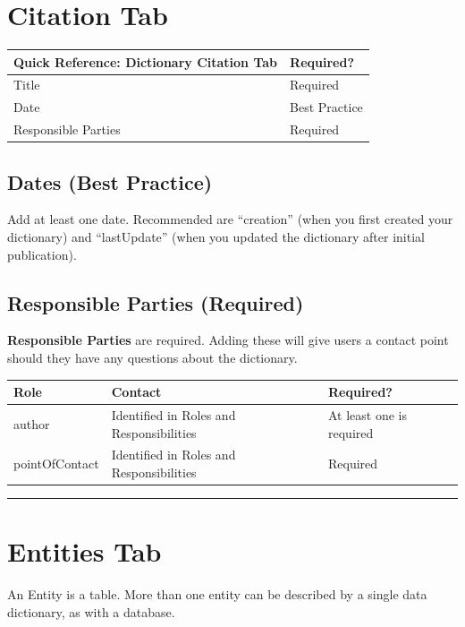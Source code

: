 \documentclass[
]{book}
\begin{document}
\hypertarget{citation-tab}{%
\section{Citation Tab}\label{citation-tab}}

\begin{longtable}[]{@{}ll@{}}
\toprule
Quick Reference: Dictionary Citation Tab & Required?\tabularnewline
\midrule
\endhead
Title & Required\tabularnewline
Date & Best Practice\tabularnewline
Responsible Parties & Required\tabularnewline
\bottomrule
\end{longtable}

\hypertarget{dates-best-practice}{%
\subsection{Dates (Best Practice)}\label{dates-best-practice}}

Add at least one date. Recommended are ``creation'' (when you first created your dictionary) and ``lastUpdate'' (when you updated the dictionary after initial publication).

\hypertarget{responsible-parties-required}{%
\subsection{Responsible Parties (Required)}\label{responsible-parties-required}}

\textbf{Responsible Parties} are required. Adding these will give users a contact point should they have any questions about the dictionary.

\begin{longtable}[]{@{}lll@{}}
\toprule
Role & Contact & Required?\tabularnewline
\midrule
\endhead
author & Identified in Roles and Responsibilities & At least one is required\tabularnewline
pointOfContact & Identified in Roles and Responsibilities & Required\tabularnewline
\bottomrule
\end{longtable}

\begin{center}\rule{0.5\linewidth}{\linethickness}\end{center}

\hypertarget{entities-tab}{%
\section{Entities Tab}\label{entities-tab}}

An Entity is a table. More than one entity can be described by a single data dictionary, as with a database.
\end{document}
